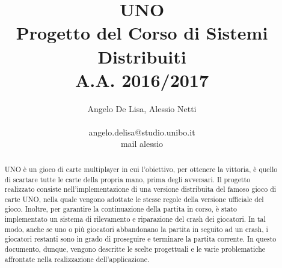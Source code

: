 \documentclass[11pt]{article} %
\title{UNO\\Progetto del Corso di Sistemi Distribuiti\\A.A. 2016/2017}
\author{Angelo De Lisa, Alessio Netti \\ \\ angelo.delisa@studio.unibo.it\\ mail alessio}
\date{} %
\begin{document}
\maketitle
\begin{otherlanguage}{english}
\begin{abstract}
UNO è un gioco di carte multiplayer in cui l'obiettivo, per ottenere la vittoria, è quello di scartare tutte le carte della propria mano, 
prima degli avversari. Il progetto realizzato consiste nell'implementazione di una versione distribuita del famoso gioco di carte UNO, nella quale vengono 
adottate le stesse regole della versione ufficiale del gioco.
Inoltre, per garantire la continuazione della partita in corso, è stato implementato un sistema di rilevamento e riparazione del crash dei giocatori. 
In tal modo, anche se uno o più giocatori abbandonano la partita in seguito ad un crash, i giocatori restanti sono in grado di proseguire e terminare 
la partita corrente. In questo documento, dunque, vengono descritte le scelte progettuali e le varie problematiche affrontate nella realizzazione dell'applicazione.
\end{abstract}
\end{otherlanguage}
\end{document}
